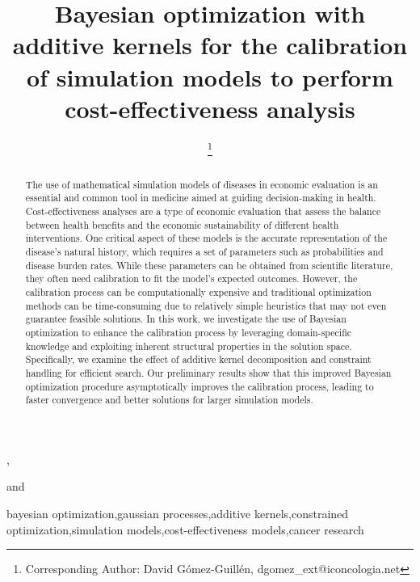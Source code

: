 \documentclass{IOS-Book-Article}
\def\hb{\hbox to 11.5 cm{}}
\begin{document}
	
	\pagestyle{headings}
	\def\thepage{}
	\begin{frontmatter}              %
		
		
		\title{Bayesian optimization with additive kernels for the calibration of simulation models to perform cost-effectiveness analysis}
		
		\markboth{}{April 2023\hb}
		
		\author[A,B]{ %
			\thanks{Corresponding Author: David Gómez-Guillén, dgomez\_ext@iconcologia.net}},
		\author[B,C]{ }
		\author[D]{ }
		and
		\author[D]{ }
		
		\address[A]{Universitat Autònoma de Barcelona (UAB)}
		\address[B]{Institut Català d'Oncologia (ICO) - Institut d'Investigació Biomèdica de Bellvitge (IDIBELL)}
		\address[C]{Consortium for Biomedical Research in Epidemiology and Public Health - CIBERESP. Carlos III Institute of Health}
		\address[D]{Institut d'Investigació en Intel·ligència Artificial - Consell Superior d'Investigacions Científiques (IIIA-CSIC)}
		
		\begin{abstract}
			The use of mathematical simulation models of diseases in economic evaluation is an essential and common tool in medicine aimed at guiding decision-making in health. Cost-effectiveness analyses are a type of economic evaluation that assess the balance between health benefits and the economic sustainability of different health interventions. One critical aspect of these models is the accurate representation of the disease's natural history, which requires a set of parameters such as probabilities and disease burden rates. While these parameters can be obtained from scientific literature, they often need calibration to fit the model's expected outcomes. However, the calibration process can be computationally expensive and traditional optimization methods can be time-consuming due to relatively simple heuristics that may not even guarantee feasible solutions.
			In this work, we investigate the use of Bayesian optimization to enhance the calibration process by leveraging domain-specific knowledge and exploiting inherent structural properties in the solution space. Specifically, we examine the effect of additive kernel decomposition and constraint handling for efficient search.
			Our preliminary results show that this improved Bayesian optimization procedure asymptotically improves the calibration process, leading to faster convergence and better solutions for larger simulation models.
		\end{abstract}
		
		\begin{keyword}
			bayesian optimization\sep gaussian processes\sep additive kernels\sep constrained optimization\sep simulation models\sep cost-effectiveness models\sep  cancer research
		\end{keyword}
	\end{frontmatter}
\end{document}
